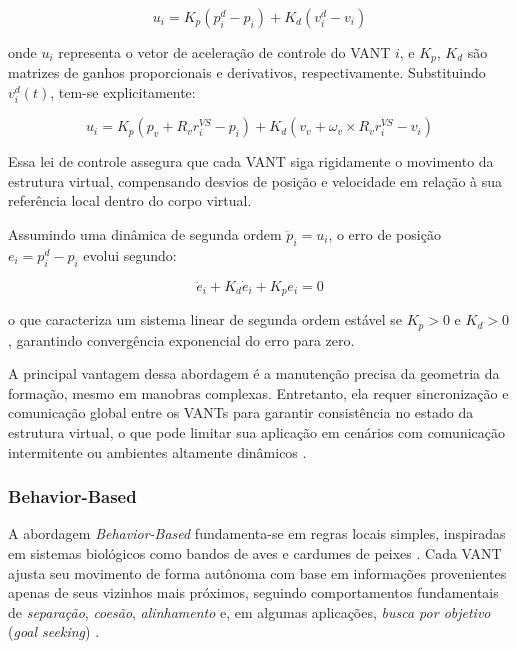 \begin{equation}
u_i = K_p (p_i^{d} - p_i) + K_d (v_i^{d} - v_i)
\end{equation}

onde $u_i$ representa o vetor de aceleração de controle do VANT $i$, e $K_p$, $K_d$ são matrizes de ganhos proporcionais e derivativos, respectivamente. Substituindo $v_i^{d}(t)$, tem-se explicitamente:

\begin{equation}
u_i = K_p (p_v + R_v r_i^{VS} - p_i) + K_d (v_v + \omega_v \times R_v r_i^{VS} - v_i)
\end{equation}

Essa lei de controle assegura que cada VANT siga rigidamente o movimento da estrutura virtual, compensando desvios de posição e velocidade em relação à sua referência local dentro do corpo virtual.

Assumindo uma dinâmica de segunda ordem $\ddot{p}_i = u_i$, o erro de posição $e_i = p_i^{d} - p_i$ evolui segundo:

\begin{equation}
\ddot{e}_i + K_d \dot{e}_i + K_p e_i = 0
\end{equation}

o que caracteriza um sistema linear de segunda ordem estável se $K_p > 0$ e $K_d > 0$, garantindo convergência exponencial do erro para zero.

A principal vantagem dessa abordagem é a manutenção precisa da geometria da formação, mesmo em manobras complexas. Entretanto, ela requer sincronização e comunicação global entre os VANTs para garantir consistência no estado da estrutura virtual, o que pode limitar sua aplicação em cenários com comunicação intermitente ou ambientes altamente dinâmicos \citep{bu2024advancement, ouyang2023formation}.




\subsubsection{Behavior-Based}

A abordagem \textit{Behavior-Based} fundamenta-se em regras locais simples, inspiradas em sistemas biológicos como bandos de aves e cardumes de peixes \citep{balch2002behaviorbased}. Cada VANT ajusta seu movimento de forma autônoma com base em informações provenientes apenas de seus vizinhos mais próximos, seguindo comportamentos fundamentais de \textit{separação}, \textit{coesão}, \textit{alinhamento} e, em algumas aplicações, \textit{busca por objetivo} (\textit{goal seeking}) \citep{ouyang2023formation, reynolds1987flocks}.

